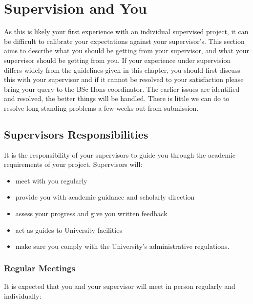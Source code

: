 \chapter{Supervision and You}


As this is likely your first experience with an individual supervised project, it
can be difficult to calibrate your expectations against your
supervisor's.  This section aims to describe what you
should be getting from your supervisor, and what your supervisor
should be getting from you.  If your experience under supervision differs widely from
the guidelines given in this chapter, you should first discuss this with
your supervisor and if it cannot be resolved to your satisfaction
please bring your query to the BSc Hons coordinator.  The earlier issues are
identified and resolved, the better things will be handled.  There is
little we can do to resolve long standing problems a few weeks out
from submission.

\section{Supervisors Responsibilities}

It is the responsibility of your supervisors to guide you through the
academic requirements of your project. Supervisors will:

\begin{itemize}
\item meet with you regularly
\item provide you with academic guidance and scholarly direction
\item assess your progress and give you written feedback
\item act as guides to University facilities
\item make sure you comply with the University’s administrative regulations.
\end{itemize}

\subsection{Regular Meetings}

It is expected that you and your supervisor will meet in person
regularly and individually:

